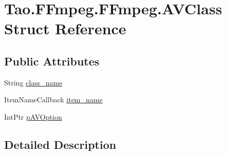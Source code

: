 \hypertarget{struct_tao_1_1_f_fmpeg_1_1_f_fmpeg_1_1_a_v_class}{
\section{Tao.FFmpeg.FFmpeg.AVClass Struct Reference}
\label{struct_tao_1_1_f_fmpeg_1_1_f_fmpeg_1_1_a_v_class}
}
\subsection*{Public Attributes}
\begin{DoxyCompactItemize}
\item 
String \hyperlink{struct_tao_1_1_f_fmpeg_1_1_f_fmpeg_1_1_a_v_class_a089edfda9da1bd06b77b27a72ace1340}{class\_\-name}
\item 
ItemNameCallback \hyperlink{struct_tao_1_1_f_fmpeg_1_1_f_fmpeg_1_1_a_v_class_a23db01a0e2f29743ffc51d507482302b}{item\_\-name}
\item 
IntPtr \hyperlink{struct_tao_1_1_f_fmpeg_1_1_f_fmpeg_1_1_a_v_class_a0c71baf53f1ee6b70277b34cb2067844}{pAVOption}
\end{DoxyCompactItemize}


\subsection{Detailed Description}


